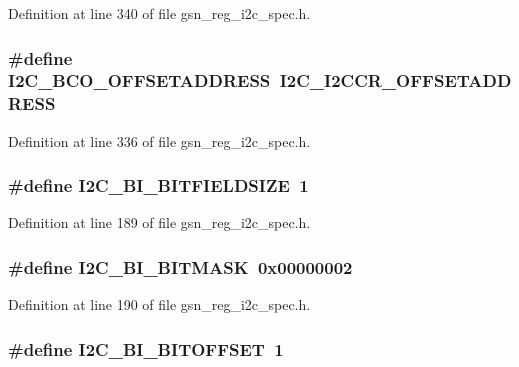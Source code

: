 Definition at line 340 of file gsn\_\-reg\_\-i2c\_\-spec.h.

\hypertarget{a00558_a0b7d915d21c6c29c146a2510d5cf4de4}{
\subsubsection[{I2C\_\-BCO\_\-OFFSETADDRESS}]{\setlength{\rightskip}{0pt plus 5cm}\#define I2C\_\-BCO\_\-OFFSETADDRESS~I2C\_\-I2CCR\_\-OFFSETADDRESS}}
\label{a00558_a0b7d915d21c6c29c146a2510d5cf4de4}


Definition at line 336 of file gsn\_\-reg\_\-i2c\_\-spec.h.

\hypertarget{a00558_a3c770f04796e15aad73e7b9a4c3d6a32}{
\subsubsection[{I2C\_\-BI\_\-BITFIELDSIZE}]{\setlength{\rightskip}{0pt plus 5cm}\#define I2C\_\-BI\_\-BITFIELDSIZE~1}}
\label{a00558_a3c770f04796e15aad73e7b9a4c3d6a32}


Definition at line 189 of file gsn\_\-reg\_\-i2c\_\-spec.h.

\hypertarget{a00558_af2b392a3c09233c07cabf05a082ef0ea}{
\subsubsection[{I2C\_\-BI\_\-BITMASK}]{\setlength{\rightskip}{0pt plus 5cm}\#define I2C\_\-BI\_\-BITMASK~0x00000002}}
\label{a00558_af2b392a3c09233c07cabf05a082ef0ea}


Definition at line 190 of file gsn\_\-reg\_\-i2c\_\-spec.h.

\hypertarget{a00558_a4349b39bdf8b905eb7a83d14004a33fc}{
\subsubsection[{I2C\_\-BI\_\-BITOFFSET}]{\setlength{\rightskip}{0pt plus 5cm}\#define I2C\_\-BI\_\-BITOFFSET~1}}
\label{a00558_a4349b39bdf8b905eb7a83d14004a33fc}


